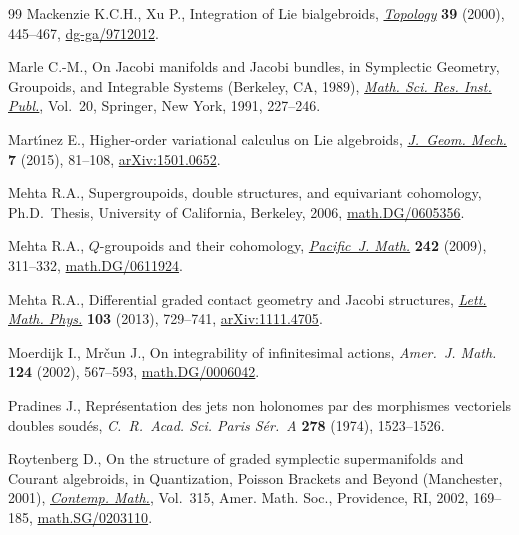 \begin{thebibliography}{99}
Mackenzie K.C.H., Xu P., Integration of {L}ie bialgebroids, \href{http://dx.doi.org/10.1016/S0040-9383(98)00069-X}{\textit{Topology}}
  \textbf{39} (2000), 445--467, \href{http://arxiv.org/abs/dg-ga/9712012}{dg-ga/9712012}.

Marle C.-M., On {J}acobi manifolds and {J}acobi bundles, in Symplectic Geometry,
  Groupoids, and Integrable Systems ({B}erkeley, {CA}, 1989), \href{http://dx.doi.org/10.1007/978-1-4613-9719-9_16}{\textit{Math.
  Sci. Res. Inst. Publ.}}, Vol.~20, Springer, New York, 1991, 227--246.

Mart{\'{\i}}nez E., Higher-order variational calculus on {L}ie algebroids,
  \href{http://dx.doi.org/10.3934/jgm.2015.7.81}{\textit{J.~Geom. Mech.}} \textbf{7} (2015), 81--108, \href{http://arxiv.org/abs/1501.0652}{arXiv:1501.0652}.

Mehta R.A., Supergroupoids, double structures, and equivariant cohomology,
  Ph.D.~Thesis, University of California, Berkeley, 2006,
  \href{http://arxiv.org/abs/math.DG/0605356}{math.DG/0605356}.

Mehta R.A., {$Q$}-groupoids and their cohomology, \href{http://dx.doi.org/10.2140/pjm.2009.242.311}{\textit{Pacific~J. Math.}}
  \textbf{242} (2009), 311--332, \href{http://arxiv.org/abs/math.DG/0611924}{math.DG/0611924}.

Mehta R.A., Dif\/ferential graded contact geometry and {J}acobi structures,
  \href{http://dx.doi.org/10.1007/s11005-013-0609-6}{\textit{Lett. Math. Phys.}} \textbf{103} (2013), 729--741, \href{http://arxiv.org/abs/1111.4705}{arXiv:1111.4705}.

Moerdijk I., Mr{\v{c}}un J., On integrability of inf\/initesimal actions,
  \textit{Amer.~J. Math.} \textbf{124} (2002), 567--593,
  \href{http://arxiv.org/abs/math.DG/0006042}{math.DG/0006042}.

Pradines J., Repr\'esentation des jets non holonomes par des morphismes
  vectoriels doubles soud\'es, \textit{C.~R.~Acad. Sci. Paris S\'er.~A}
  \textbf{278} (1974), 1523--1526.

Roytenberg D., On the structure of graded symplectic supermanifolds and
  {C}ourant algebroids, in Quantization, {P}oisson Brackets and Beyond
  ({M}anchester, 2001), \href{http://dx.doi.org/10.1090/conm/315/05479}{\textit{Contemp. Math.}}, Vol.~315, Amer. Math. Soc.,
  Providence, RI, 2002, 169--185, \href{http://arxiv.org/abs/math.SG/0203110}{math.SG/0203110}.


\end{thebibliography}
